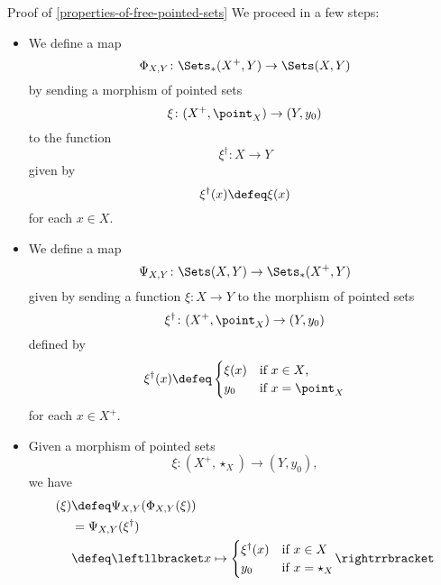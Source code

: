 \begin{Proof}{Proof of \cref{properties-of-free-pointed-sets}}
    We proceed in a few steps:
    \begin{itemize}
        \item{}We define a map
            \[
                \Phi_{X,Y}%
                \colon%
                \Sets_{*}(X^{+},Y)%
                \to%
                \Sets(X,Y)%
            \]%
            by sending a morphism of pointed sets
            \[
                \xi%
                \colon%
                (X^{+},\point_{X})%
                \to%
                (Y,y_{0})%
            \]%
            to the function%
            \[
                \xi^{\dagger}%
                \colon%
                X%
                \to%
                Y%
            \]%
            given by
            \[
                \xi^{\dagger}(x)%
                \defeq
                \xi(x)%
            \]%
            for each $x\in X$.
        \item{}We define a map
            \[
                \Psi_{X,Y}%
                \colon%
                \Sets(X,Y)%
                \to%
                \Sets_{*}(X^{+},Y)%
            \]%
            given by sending a function $\xi\colon X\to Y$ to the morphism of pointed sets
            \[
                \xi^{\dagger}%
                \colon%
                (X^{+},\point_{X})%
                \to%
                (Y,y_{0})%
            \]%
            defined by
            \[
                \xi^{\dagger}(x)%
                \defeq%
                \begin{cases}
                    \xi(x) & \text{if $x\in X$,}\\
                    y_{0}  & \text{if $x=\point_{X}$}
                \end{cases}
            \]%
            for each $x\in X^{+}$.
        \item{}Given a morphism of pointed sets
            \[
                \xi%
                \colon%
                (X^{+},\star_{X})%
                \to%
                (Y,y_{0}),%
            \]%
            we have
            \begin{align*}
                [\Psi_{X,Y}\circ\Phi_{X,Y}](\xi) &\defeq \Psi_{X,Y}(\Phi_{X,Y}(\xi))\\%
                                                 &=      \Psi_{X,Y}(\xi^{\dagger})\\%
                                                 &\defeq \leftllbracket x\mapsto{\begin{cases}\xi^{\dagger}(x)&\text{if $x\in X$}\\y_{0}&\text{if $x=\star_{X}$}\end{cases}}\rightrrbracket\\%

\end{align*}
\end{itemize}
\end{Proof}
